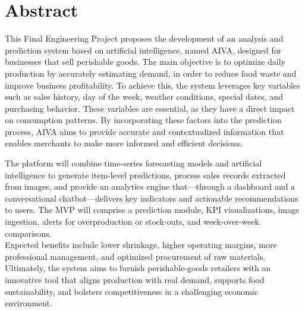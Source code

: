 \chapter*{Abstract}

    This Final Engineering Project proposes the development of an analysis and prediction system based on artificial intelligence, named AIVA, designed for businesses that sell perishable goods. The main objective is to optimize daily production by accurately estimating demand, in order to reduce food waste and improve business profitability. To achieve this, the system leverages key variables such as sales history, day of the week, weather conditions, special dates, and purchasing behavior. These variables are essential, as they have a direct impact on consumption patterns. By incorporating these factors into the prediction process, AIVA aims to provide accurate and contextualized information that enables merchants to make more informed and efficient decisions.
    
    The platform will combine time-series forecasting models and artificial intelligence to generate item-level predictions, process sales records extracted from images, and provide an analytics engine that—through a dashboard and a conversational chatbot—delivers key indicators and actionable recommendations to users. The MVP will comprise a prediction module, KPI visualizations, image ingestion, alerts for overproduction or stock-outs, and week-over-week comparisons.\\
    
    Expected benefits include lower shrinkage, higher operating margins, more professional management, and optimized procurement of raw materials. Ultimately, the system aims to furnish perishable-goods retailers with an innovative tool that aligns production with real demand, supports food sustainability, and bolsters competitiveness in a challenging economic environment.

